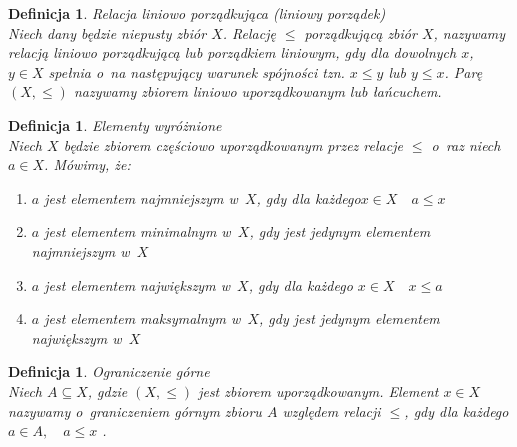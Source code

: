 \documentclass[12pt,a4paper]{report}
\newtheorem{definition}[theorem]{Definicja}
\begin{document}
\begin{definition}{Relacja liniowo porządkująca (liniowy porządek) \cite[Rozdział 2]{blaszczyk2007}}\label{def-porzadek-liniowy}\\
Niech dany będzie niepusty zbiór $X$. Relację $\leq$ porządkującą zbiór $X$, nazywamy relacją liniowo porządkującą lub porządkiem liniowym, gdy dla dowolnych $x$, $y \in X$ spełnia o~na następujący warunek spójności tzn. $x \leq y$ lub $y \leq x$. Parę $(X, \leq)$ nazywamy zbiorem liniowo uporządkowanym lub łańcuchem.
\end{definition}


\begin{definition}{Elementy wyróżnione \cite[Rozdział 2]{blaszczyk2007}}\\
Niech $X$ będzie zbiorem częściowo uporządkowanym przez relacje $\leq$ o~raz niech $a \in X$. Mówimy, że:
\begin{enumerate}
\item $a$ jest elementem najmniejszym w~$X$, gdy dla każdego$x \in X \quad a \leq x$
\item $a$ jest elementem minimalnym w~$X$, gdy jest jedynym elementem najmniejszym w~$X$
\item $a$ jest elementem największym w~$X$, gdy dla każdego $ x \in X \quad x\leq a$
\item $a$ jest elementem maksymalnym w~$X$, gdy jest jedynym elementem największym w~$X$
\end{enumerate}

\end{definition}


\begin{definition}{Ograniczenie górne \cite[Rozdział 2]{blaszczyk2007}}\\
Niech $A \subseteq X$, gdzie $(X, \leq)$ jest zbiorem uporządkowanym. Element $x \in X$ nazywamy o~graniczeniem górnym zbioru $A$ względem relacji $\leq$, gdy dla każdego $a \in A, \quad a \leq x$ . 
\end{definition}
\end{document}
